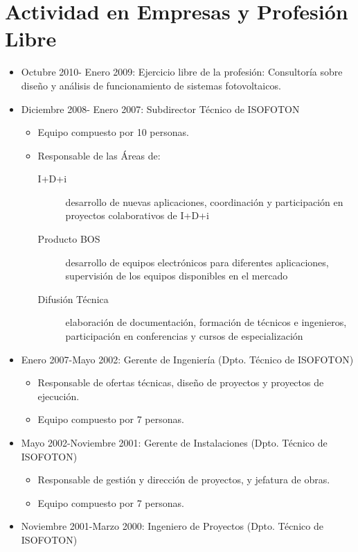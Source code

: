\documentclass[article, a4paper]{memoir}
\begin{document}
\section{Actividad en Empresas y Profesión Libre}
\label{sec:org8a41522}
\begin{itemize}
\item Octubre 2010- Enero 2009: Ejercicio libre de la profesión:
Consultoría sobre diseño y análisis de funcionamiento de sistemas fotovoltaicos.

\item Diciembre 2008- Enero 2007: Subdirector Técnico de ISOFOTON
\begin{itemize}
\item Equipo compuesto por 10 personas.
\item Responsable de las Áreas de:
\begin{description}
\item[{I+D+i}] desarrollo de nuevas aplicaciones, coordinación y participación en proyectos colaborativos de I+D+i
\item[{Producto BOS}] desarrollo de equipos electrónicos para diferentes aplicaciones, supervisión de los equipos disponibles en el mercado
\item[{Difusión Técnica}] elaboración de documentación, formación de técnicos e ingenieros, participación en conferencias y cursos de especialización
\end{description}
\end{itemize}

\item Enero 2007-Mayo 2002: Gerente de Ingeniería (Dpto. Técnico de ISOFOTON)
\begin{itemize}
\item Responsable de ofertas técnicas, diseño de proyectos y proyectos de ejecución.
\item Equipo compuesto por 7 personas.
\end{itemize}

\item Mayo 2002-Noviembre 2001: Gerente de Instalaciones (Dpto. Técnico de ISOFOTON)
\begin{itemize}
\item Responsable de gestión y dirección de proyectos, y jefatura de obras.
\item Equipo compuesto por 7 personas.
\end{itemize}

\item Noviembre 2001-Marzo 2000: Ingeniero de Proyectos (Dpto. Técnico de ISOFOTON)
\end{itemize}
\end{document}
